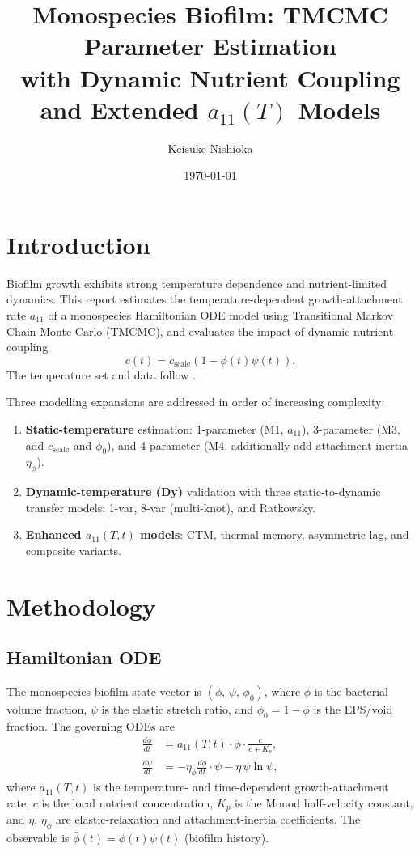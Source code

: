 \documentclass[11pt,a4paper]{article}
\title{Monospecies Biofilm: TMCMC Parameter Estimation\\
with Dynamic Nutrient Coupling and Extended $a_{11}(T)$ Models}
\author{Keisuke Nishioka}
\date{\today}
\begin{document}
\maketitle

\tableofcontents
\bigskip

\section{Introduction}
Biofilm growth exhibits strong temperature dependence and nutrient-limited dynamics.
This report estimates the temperature-dependent growth-attachment rate $a_{11}$ of a
monospecies Hamiltonian ODE model using Transitional Markov Chain Monte Carlo (TMCMC),
and evaluates the impact of dynamic nutrient coupling
\[
  c(t) = c_{\mathrm{scale}} \left(1-\phi(t)\psi(t)\right).
\]
The temperature set and data follow \cite{liu2019}.

Three modelling expansions are addressed in order of increasing complexity:
\begin{enumerate}
  \item \textbf{Static-temperature} estimation: 1-parameter (M1, $a_{11}$),
        3-parameter (M3, add $c_{\mathrm{scale}}$ and $\phi_0$), and
        4-parameter (M4, additionally add attachment inertia $\eta_\phi$).
  \item \textbf{Dynamic-temperature (Dy)} validation with three static-to-dynamic
        transfer models: 1-var, 8-var (multi-knot), and Ratkowsky.
  \item \textbf{Enhanced $a_{11}(T,t)$ models}: CTM, thermal-memory,
        asymmetric-lag, and composite variants.
\end{enumerate}

\section{Methodology}
\subsection{Hamiltonian ODE}
The monospecies biofilm state vector is $(\phi,\,\psi,\,\phi_0)$, where $\phi$
is the bacterial volume fraction, $\psi$ is the elastic stretch ratio, and
$\phi_0=1-\phi$ is the EPS/void fraction. The governing ODEs are
\begin{align}
    \frac{d\phi}{dt} &= a_{11}(T,t)\cdot\phi\cdot\frac{c}{c+K_p}, \label{eq:phi}\\
    \frac{d\psi}{dt} &= -\eta_{\phi}\frac{d\phi}{dt}\cdot\psi
                        -\eta\,\psi\ln\psi, \label{eq:psi}
\end{align}
where $a_{11}(T,t)$ is the temperature- and time-dependent growth-attachment rate,
$c$ is the local nutrient concentration, $K_p$ is the Monod half-velocity constant,
and $\eta,\,\eta_\phi$ are elastic-relaxation and attachment-inertia coefficients.
The observable is $\bar\phi(t)=\phi(t)\psi(t)$ (biofilm history).
\end{document}
